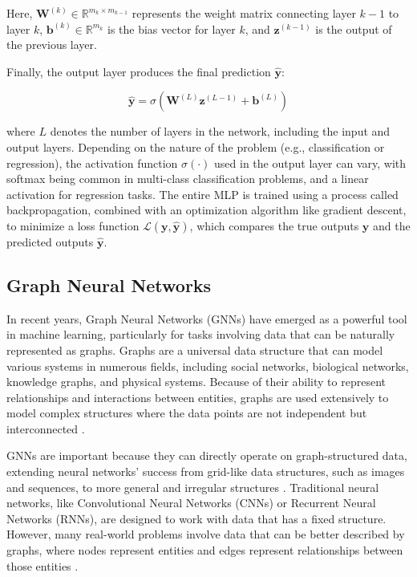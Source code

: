 Here, $\mathbf{W}^{(k)} \in \mathbb{R}^{m_k \times m_{k-1}}$ represents the weight matrix connecting layer $k-1$ to layer $k$, $\mathbf{b}^{(k)} \in \mathbb{R}^{m_k}$ is the bias vector for layer $k$, and $\mathbf{z}^{(k-1)}$ is the output of the previous layer.

Finally, the output layer produces the final prediction $\mathbf{\hat{y}}$:

\begin{equation}
    \mathbf{\hat{y}} = \sigma\left(\mathbf{W}^{(L)}\mathbf{z}^{(L-1)} + \mathbf{b}^{(L)}\right) 
    \label{eq:output_layer}
\end{equation}

\noindent where $L$ denotes the number of layers in the network, including the input and output layers. Depending on the nature of the problem (e.g., classification or regression), the activation function $\sigma(\cdot)$ used in the output layer can vary, with softmax being common in multi-class classification problems, and a linear activation for regression tasks. The entire MLP is trained using a process called backpropagation, combined with an optimization algorithm like gradient descent, to minimize a loss function $\mathcal{L}(\mathbf{y}, \mathbf{\hat{y}})$, which compares the true outputs $\mathbf{y}$ and the predicted outputs $\mathbf{\hat{y}}$. 


\subsection{Graph Neural Networks}

In recent years, Graph Neural Networks (GNNs) have emerged as a powerful tool in machine learning, particularly for tasks involving data that can be naturally represented as graphs. Graphs are a universal data structure that can model various systems in numerous fields, including social networks, biological networks, knowledge graphs, and physical systems. Because of their ability to represent relationships and interactions between entities, graphs are used extensively to model complex structures where the data points are not independent but interconnected \cite{Jia_Wang_Shou_Hosseini_Bai_2023}.

GNNs are important because they can directly operate on graph-structured data, extending neural networks' success from grid-like data structures, such as images and sequences, to more general and irregular structures \cite{Jia_Wang_Shou_Hosseini_Bai_2023a} . Traditional neural networks, like Convolutional Neural Networks (CNNs) or Recurrent Neural Networks (RNNs), are designed to work with data that has a fixed structure. However, many real-world problems involve data that can be better described by graphs, where nodes represent entities and edges represent relationships between those entities \cite{Gupta_Matta_Pant_2021}. 


